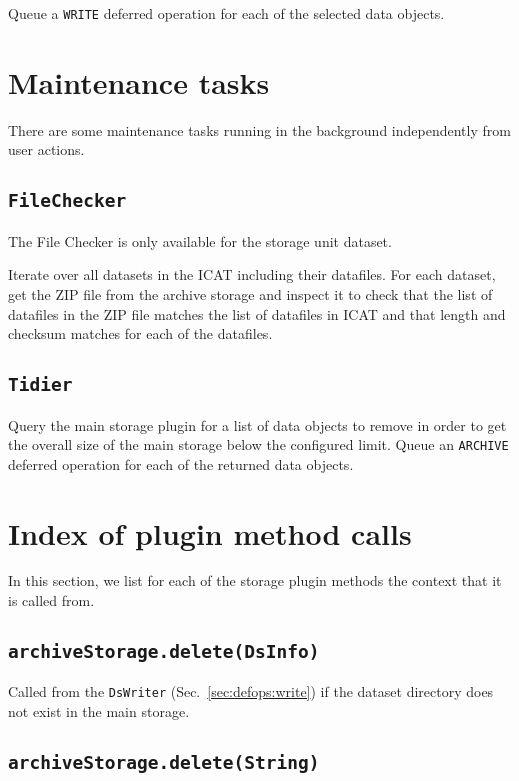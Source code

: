 \documentclass[paper=a4]{scrartcl}
\begin{document}
Queue a \texttt{WRITE} deferred operation for each of the selected
data objects.


\section{Maintenance tasks}
\label{sec:maintenance}

There are some maintenance tasks running in the background
independently from user actions.

\subsection{\texttt{FileChecker}}
\label{sec:maintenance:filechecker}

The File Checker is only available for the storage unit dataset.

Iterate over all datasets in the ICAT including their datafiles.  For
each dataset, get the ZIP file from the archive storage and inspect it
to check that the list of datafiles in the ZIP file matches the list
of datafiles in ICAT and that length and checksum matches for each of
the datafiles.

\subsection{\texttt{Tidier}}
\label{sec:maintenance:tidier}

Query the main storage plugin for a list of data objects to remove in
order to get the overall size of the main storage below the configured
limit.  Queue an \texttt{ARCHIVE} deferred operation for each of the
returned data objects.


\section{Index of plugin method calls}
\label{sec:plugincalls}

In this section, we list for each of the storage plugin methods the
context that it is called from.

\subsection{\texttt{archiveStorage.delete(DsInfo)}}

Called from the \texttt{DsWriter} (Sec.~\ref{sec:defops:write}) if
the dataset directory does not exist in the main storage.

\subsection{\texttt{archiveStorage.delete(String)}}
\end{document}
